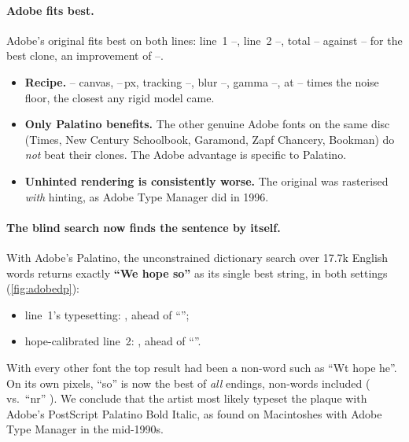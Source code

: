 \documentclass[10pt,a4paper]{article}
\providecommand{\AdobeLineOne}{--}\providecommand{\AdobeLineTwo}{--}\providecommand{\AdobeTotal}{--}\providecommand{\AdobeNextTotal}{--}\providecommand{\AdobeGain}{--}
\providecommand{\AdobeCanvas}{--}\providecommand{\AdobeP}{--}\providecommand{\AdobeTrack}{--}\providecommand{\AdobeGamma}{--}\providecommand{\AdobeBlur}{--}\providecommand{\AdobeRatio}{--}
\newcommand{\q}[1]{``#1''}
\begin{document}
\paragraph{Adobe fits best.}
Adobe's original fits best on both lines: line~1 \AdobeLineOne{}, line~2 \AdobeLineTwo, total \AdobeTotal{} against
\AdobeNextTotal{} for the best clone, an improvement of \AdobeGain.
\begin{itemize}
\item \textbf{Recipe.} \AdobeCanvas{} canvas, \AdobeP\,px, tracking \AdobeTrack, blur \AdobeBlur, gamma
\AdobeGamma{}, at \AdobeRatio{} times the noise floor, the closest any rigid model came.
\item \textbf{Only Palatino benefits.} The other genuine Adobe fonts on the same disc (Times, New Century Schoolbook,
Garamond, Zapf Chancery, Bookman) do \emph{not} beat their clones. The Adobe advantage is specific to Palatino.
\item \textbf{Unhinted rendering is consistently worse.} The original was rasterised \emph{with} hinting, as Adobe Type
Manager did in 1996.
\end{itemize}

\paragraph{The blind search now finds the sentence by itself.}
With Adobe's Palatino, the unconstrained dictionary search over 17.7k English words returns exactly \textbf{\q{We hope
so}} as its single best string, in both settings (\cref{fig:adobedp}):
\begin{itemize}
\item line~1's typesetting: \AdobeDPTopSse, ahead of \q{\AdobeDPSecond};
\item hope-calibrated line~2: \AdobeDPHopeTopSse, ahead of \q{\AdobeDPHopeSecond}.
\end{itemize}
With every other font the top result had been a non-word such as \q{Wt hope he}. On its own pixels, \q{so} is now the
best of \emph{all} endings, non-words included (\AdobeEndSo{} vs.\ \q{nr} \AdobeEndNr). We conclude that the artist
most likely typeset the plaque with Adobe's PostScript Palatino Bold Italic, as found on Macintoshes with Adobe Type
Manager in the mid-1990s.
\end{document}
